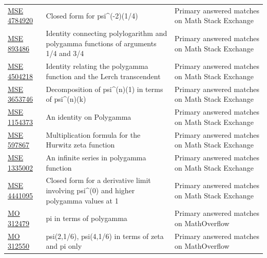\begin{longtable}{@{}p{}p{}p{}@{}}
\href{https://math.stackexchange.com/questions/4784920/closed-form-for-psi-2-left-frac14-right}{MSE 4784920} & Closed form for psi\textasciicircum{}(-2)(1/4) & Primary answered matches on Math Stack Exchange\\
\href{https://math.stackexchange.com/questions/893486/looking-for-an-identity-connecting-polylogarithm-and-polygamma-functions-of-argu}{MSE 893486} & Identity connecting polylogarithm and polygamma functions of arguments 1/4 and 3/4 & Primary answered matches on Math Stack Exchange\\
\href{https://math.stackexchange.com/questions/4504218/can-somebody-show-me-how-to-derive-the-identity-relating-the-polygamma-function}{MSE 4504218} & Identity relating the polygamma function and the Lerch transcendent & Primary answered matches on Math Stack Exchange\\
\href{https://math.stackexchange.com/questions/3653746/decomposition-of-psin1-in-terms-of-psink}{MSE 3653746} & Decomposition of psi\textasciicircum{}(n)(1) in terms of psi\textasciicircum{}(n)(k) & Primary answered matches on Math Stack Exchange\\
\href{https://math.stackexchange.com/questions/1154373/an-identity-on-polygamma}{MSE 1154373} & An identity on Polygamma & Primary answered matches on Math Stack Exchange\\
\href{https://math.stackexchange.com/questions/597867/the-multiplication-formula-for-the-hurwitz-zeta-function}{MSE 597867} & Multiplication formula for the Hurwitz zeta function & Primary answered matches on Math Stack Exchange\\
\href{https://math.stackexchange.com/questions/1335002/an-infinite-series-in-polygamma-function}{MSE 1335002} & An infinite series in polygamma function & Primary answered matches on Math Stack Exchange\\
\href{https://math.stackexchange.com/questions/4441095/closed-form-for-lim-m-to-0-frac-partial2a-1-partial-m2a-1-pi-csc}{MSE 4441095} & Closed form for a derivative limit involving psi\textasciicircum{}(0) and higher polygamma values at 1 & Primary answered matches on Math Stack Exchange\\
\href{https://mathoverflow.net/questions/312479/pi-in-terms-of-polygamma}{MO 312479} & pi in terms of polygamma & Primary answered matches on MathOverflow\\
\href{https://mathoverflow.net/questions/312550/psi2-1-6-psi4-1-6-in-terms-of-zeta-and-pi-only-and-another-closed-form-f}{MO 312550} & psi(2,1/6), psi(4,1/6) in terms of zeta and pi only & Primary answered matches on MathOverflow\\

\end{longtable}
